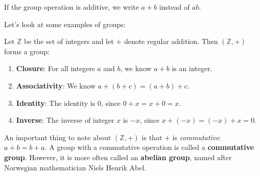 \begin{remark}
    If the group operation is additive, we write $a + b$ instead of $ab$.
\end{remark}

Let's look at some examples of groups:
\begin{example}
    Let $\mathbb{Z}$ be the set of integers and let $+$ denote regular addition. Then $(\mathbb{Z}, +)$ forms a group:
    \begin{enumerate}
        \item \textbf{Closure}: For all integers $a$ and $b$, we know $a + b$ is an integer.
        \item \textbf{Associativity}: We know $a + (b + c) = (a + b) + c$.
        \item \textbf{Identity}: The identity is 0, since $0 + x = x + 0 = x$.
        \item \textbf{Inverse}: The inverse of integer $x$ is $-x$, since $x + (-x) = (-x) + x = 0$.
    \end{enumerate}
\end{example}

An important thing to note about $(\mathbb{Z}, +)$ is that $+$ is \textit{commutative}: $a + b = b + a$. A group with a commutative operation is called a \textbf{commutative group}. However, it is more often called an \textbf{abelian group}, named after Norwegian mathematician Niels Henrik Abel.

